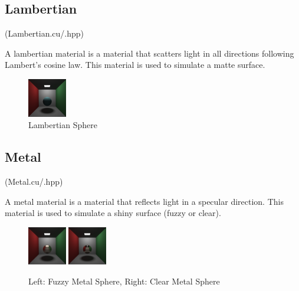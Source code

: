 \documentclass{article}
\begin{document}
    \subsection{Lambertian}
    (Lambertian.cu/.hpp)\par
    A lambertian material is a material that scatters light in all directions following Lambert's cosine law. This material is used to simulate a matte surface. \par
    \begin{figure}[H]
        \centering
        \includegraphics[width=0.15\textwidth]{samples/LambertianSphere.png}
        \caption{Lambertian Sphere}
    \end{figure}


    \subsection{Metal}
    (Metal.cu/.hpp)\par
    A metal material is a material that reflects light in a specular direction. This material is used to simulate a shiny surface (fuzzy or clear). \par
    \begin{figure}[H]
        \centering
        \includegraphics[width=0.15\textwidth]{samples/MetalSphereFuzz.png}
        \includegraphics[width=0.15\textwidth]{samples/MetalSphereNoFuzz.png}
        \caption{Left: Fuzzy Metal Sphere, Right: Clear Metal Sphere}
    \end{figure}
\end{document}
